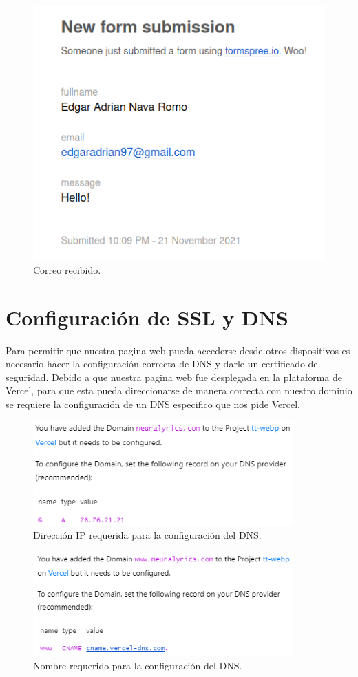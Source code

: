 \documentclass[12pt, a4paper, titlepage]{report}
\begin{document}
\begin{figure}[H] 
	\includegraphics[width=13.5cm]{./imagenes/Pruebas/Correo.png}
	\centering \caption{Correo recibido.}
\end{figure}


\newpage

\section{Configuración de SSL y DNS}

Para permitir que nuestra pagina web pueda accederse desde otros dispositivos es necesario hacer la configuración correcta de DNS y darle un certificado de seguridad. Debido a que nuestra pagina web fue desplegada en la plataforma de Vercel, para que esta pueda direccionarse de manera correcta con nuestro dominio se requiere la configuración de un DNS especifico que nos pide Vercel.
\begin{figure}[H] 
	\includegraphics[width=10cm]{./imagenes/DnsSSL/Dns1.png}
	\centering \caption{Dirección IP requerida para la configuración del DNS.}
\end{figure}
\begin{figure}[H] 
	\includegraphics[width=10cm]{./imagenes/DnsSSL/Dns2.png}
	\centering \caption{Nombre requerido para la configuración del DNS.}
\end{figure}
\end{document}
